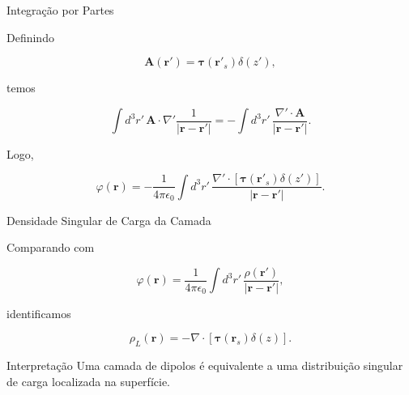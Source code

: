 \documentclass[aspectratio=169]{beamer}
\begin{document}
\begin{frame}{Integração por Partes}

Definindo

\[
\mathbf A(\mathbf r')
=
\boldsymbol{\tau}(\mathbf r'_s)\delta(z'),
\]

temos

\begin{equation}
\int d^3r'\,
\mathbf A\cdot\nabla'
\frac{1}{|\mathbf r-\mathbf r'|}
=
-
\int d^3r'\,
\frac{\nabla'\cdot\mathbf A}{|\mathbf r-\mathbf r'|}.
\end{equation}

Logo,

\begin{eqbox}
\begin{equation}
\varphi(\mathbf r)
=
-\frac{1}{4\pi\epsilon_0}
\int
d^3r'\,
\frac{
\nabla'\cdot
\left[
\boldsymbol{\tau}(\mathbf r'_s)\delta(z')
\right]
}
{|\mathbf r-\mathbf r'|}.
\tag{4.37}
\label{eq:4.37}
\end{equation}
\end{eqbox}

\end{frame}

\begin{frame}{Densidade Singular de Carga da Camada}

Comparando com

\begin{equation}
\varphi(\mathbf r)
=
\frac{1}{4\pi\epsilon_0}
\int d^3r'\,
\frac{\rho(\mathbf r')}{|\mathbf r-\mathbf r'|},
\end{equation}

identificamos

\begin{eqbox}
\begin{equation}
\rho_L(\mathbf r)
=
-\nabla\cdot
\left[
\boldsymbol{\tau}(\mathbf r_s)\delta(z)
\right].
\tag{4.38}
\label{eq:4.38}
\end{equation}
\end{eqbox}

\begin{mybox}{Interpretação}
Uma camada de dipolos é equivalente a uma distribuição singular de carga localizada na superfície.
\end{mybox}

\end{frame}
\end{document}
